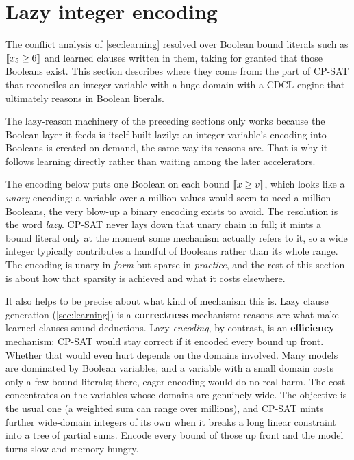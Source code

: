 \section{Lazy integer encoding}\label{part:encoding}

The conflict analysis of \cref{sec:learning} resolved over Boolean bound
literals such as $[\![x_5 \ge 6]\!]$ and learned clauses written in them, taking for
granted that those Booleans exist. This section describes where they come from:
the part of CP-SAT that reconciles an integer variable with a huge domain with a
CDCL engine that ultimately reasons in Boolean literals.

The lazy-reason machinery of the preceding sections only works because the
Boolean layer it feeds is itself built lazily: an integer variable's encoding
into Booleans is created on demand, the same way its reasons are. That is why it
follows learning directly rather than waiting among the later accelerators.

The encoding below puts one Boolean on each bound $[\![x \ge v]\!]$, which looks like a \emph{unary} encoding: a variable over a million
values would seem to need a million Booleans, the very blow-up a binary encoding
exists to avoid. The resolution is the word \emph{lazy}. CP-SAT never lays down
that unary chain in full; it mints a bound literal only at the moment some
mechanism actually refers to it, so a wide integer typically contributes a
handful of Booleans rather than its whole range. The encoding is unary in
\emph{form} but sparse in \emph{practice}, and the rest of this section is about
how that sparsity is achieved and what it costs elsewhere.

It also helps to be precise about what kind of mechanism this is. Lazy clause
generation (\cref{sec:learning}) is a \textbf{correctness} mechanism:
reasons are what make learned clauses sound deductions. Lazy \emph{encoding}, by
contrast, is an \textbf{efficiency} mechanism: CP-SAT would stay correct if it
encoded every bound up front. Whether that would even hurt depends on the
domains involved. Many models are dominated by Boolean variables, and a variable
with a small domain costs only a few bound literals; there, eager encoding
would do no real harm. The cost concentrates on the variables whose domains are
genuinely wide. The objective is the usual one (a weighted sum can range over
millions), and CP-SAT mints further wide-domain integers of its own when it
breaks a long linear constraint into a tree of partial sums. Encode every
bound of those up front and the model turns slow and memory-hungry.

